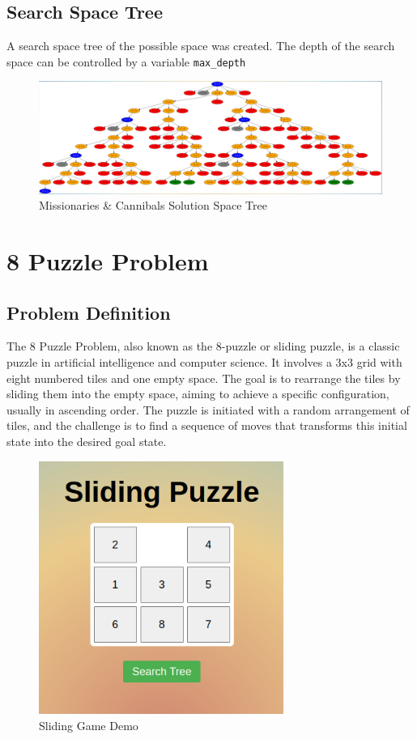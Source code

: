 \documentclass[12pt]{article}
\begin{document}
\subsection{Search Space Tree}
A search space tree of the possible space was created. The depth of the search space can be controlled by a variable \texttt{max\_depth}
\begin{figure}[h]
  \centerline{\includegraphics[width = 150mm]{MnC_Space.png}}
  \caption{Missionaries & Cannibals Solution Space Tree}
  \label{fig}
\end{figure}

\clearpage
\section{8 Puzzle Problem}
\subsection{Problem Definition}
The 8 Puzzle Problem, also known as the 8-puzzle or sliding puzzle, is a classic puzzle in artificial intelligence and computer science. It involves a 3x3 grid with eight numbered tiles and one empty space. The goal is to rearrange the tiles by sliding them into the empty space, aiming to achieve a specific configuration, usually in ascending order. The puzzle is initiated with a random arrangement of tiles, and the challenge is to find a sequence of moves that transforms this initial state into the desired goal state.

\begin{figure}[h]
  \centerline{\includegraphics[width = 80mm]{Sliding_Game_demo.png}}
  \caption{Sliding Game Demo}
  \label{fig}
\end{figure}
\end{document}
